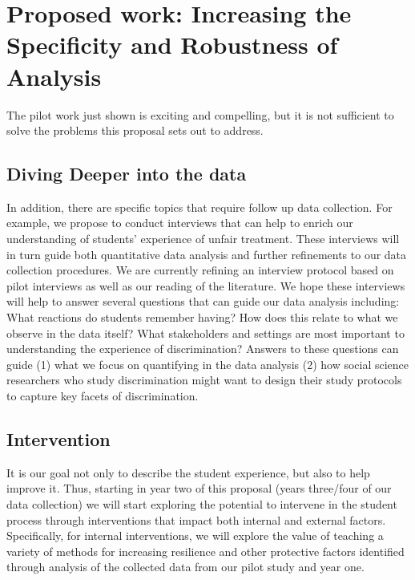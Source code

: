 \section{Proposed work: Increasing the Specificity and Robustness of Analysis}
The pilot work just shown is exciting and compelling, but it is not sufficient to solve the problems this proposal sets out to address. 



\subsection{Diving Deeper into the data}
In addition, there are specific topics that require follow up data collection. For example, we propose to conduct interviews that can help to enrich our understanding of students’ experience of unfair treatment. These interviews will in turn guide both quantitative data analysis and further refinements to our data collection procedures. We are currently refining an interview protocol based on pilot interviews as well as our reading of the literature. We hope these interviews will help to answer several questions that can guide our data analysis including:
What reactions do students remember having? How does this relate to what we observe in the data itself? 
What stakeholders and settings are most important to understanding the experience of discrimination? 
Answers to these questions can guide (1) what we focus on quantifying in the data analysis (2) how social science researchers who study discrimination might want to design their study protocols to capture key facets of discrimination.


\subsection{Intervention}
It is our goal not only to describe the student experience, but also to help improve it. Thus, starting in year two of this proposal (years three/four of our data collection) we will start exploring the potential to intervene in the student process through interventions that impact both internal and external factors. Specifically, for internal interventions, we will explore the value of teaching a variety of methods for increasing resilience and other protective factors identified through analysis of the collected data from our pilot study and year one.

